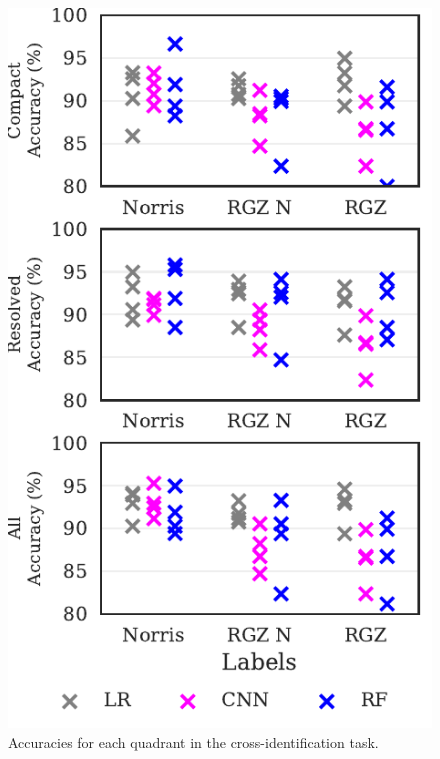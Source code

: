 \documentclass[fleqn,usenatbib,usedcolumn]{mnras}
\begin{document}
  \begin{figure}
  \centering
  \includegraphics[width=\columnwidth]{images/cdfs_cross_identification_grid.pdf}
  \caption{Accuracies for each quadrant in the cross-identification
    task.\label{fig:cross-id-accuracy}}
  \end{figure}
\end{document}
